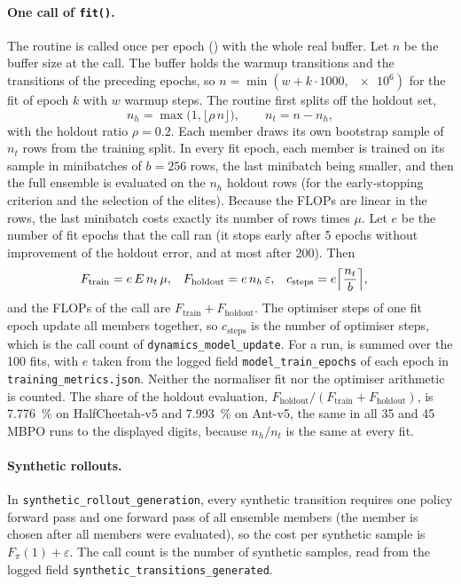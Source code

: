 \paragraph{One call of \texttt{fit()}.} The routine is called once per epoch () with the whole real buffer.
Let $n$ be the buffer size at the call.
The buffer holds the warmup transitions and the transitions of the preceding epochs, so $n=\min(w+k\cdot\num{1000},\,\num{e6})$ for the fit of epoch $k$ with $w$ warmup steps.
The routine first splits off the holdout set,
\begin{equation}
  n_h=\max\bigl(1,\lfloor \rho\,n\rfloor\bigr),\qquad n_t=n-n_h ,
  \label{eq:app-split}
\end{equation}
with the holdout ratio $\rho=0.2$.
Each member draws its own bootstrap sample of $n_t$ rows from the training split.
In every fit epoch, each member is trained on its sample in minibatches of $b=256$ rows, the last minibatch being smaller, and then the full ensemble is evaluated on the $n_h$ holdout rows (for the early-stopping criterion and the selection of the elites).
Because the FLOPs are linear in the rows, the last minibatch costs exactly its number of rows times $\mu$.
Let $e$ be the number of fit epochs that the call ran (it stops early after \num{5} epochs without improvement of the holdout error, and at most after \num{200}).
Then
\begin{align}
  F_{\mathrm{train}} &= e\,E\,n_t\,\mu , &
  F_{\mathrm{holdout}} &= e\,n_h\,\varepsilon , &
  c_{\mathrm{steps}} &= e\Bigl\lceil \frac{n_t}{b}\Bigr\rceil ,
  \label{eq:app-fit}
\end{align}
and the FLOPs of the call are $F_{\mathrm{train}}+F_{\mathrm{holdout}}$.
The optimiser steps of one fit epoch update all members together, so $c_{\mathrm{steps}}$ is the number of optimiser steps, which is the call count of \texttt{dynamics\_model\_update}.
For a run,  is summed over the \num{100} fits, with $e$ taken from the logged field \texttt{model\_train\_epochs} of each epoch in \texttt{training\_metrics.json}.
Neither the normaliser fit nor the optimiser arithmetic is counted.
The share of the holdout evaluation, $F_{\mathrm{holdout}}/(F_{\mathrm{train}}+F_{\mathrm{holdout}})$, is \SI{7.776}{\percent} on HalfCheetah-v5 and \SI{7.993}{\percent} on Ant-v5, the same in all \num{35} and \num{45} MBPO runs to the displayed digits, because $n_h/n_t$ is the same at every fit.

\paragraph{Synthetic rollouts.} In \texttt{synthetic\_rollout\_generation}, every synthetic transition requires one policy forward pass and one forward pass of all ensemble members (the member is chosen after all members were evaluated), so the cost per synthetic sample is $F_\pi(1)+\varepsilon$.
The call count is the number of synthetic samples, read from the logged field \texttt{synthetic\_transitions\_generated}.

